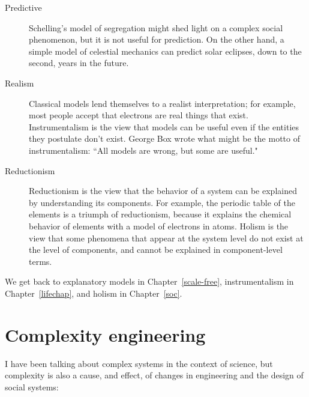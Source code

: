 \documentclass[12pt]{book}
\theoremstyle{exercise}
\newcommand{\myrightarrow}{\ensuremath \rightarrow}
\begin{document}
\begin{description}

\item[Predictive \myrightarrow~explanatory] Schelling's model
of segregation might shed light on a complex social phenomenon, but
it is not useful for prediction.  On the other hand, a simple model
of celestial mechanics can predict solar eclipses, down to the second,
years in the future.


\item[Realism \myrightarrow~instrumentalism] Classical models lend
  themselves to a realist interpretation; for example, most people
  accept that electrons are real things that exist.  Instrumentalism
  is the view that models can be useful even if the entities they
  postulate don't exist.  George Box wrote what might be the motto of
  instrumentalism: ``All models are wrong, but some are useful."


\item[Reductionism \myrightarrow~holism] Reductionism is the view that
  the behavior of a system can be explained by understanding its
  components.  For example, the periodic table of the elements is a
  triumph of reductionism, because it explains the chemical behavior
  of elements with a model of electrons in atoms.  Holism
  is the view that some phenomena that appear at the system level do
  not exist at the level of components, and cannot be explained in
  component-level terms.


\end{description}

We get back to explanatory models in Chapter~\ref{scale-free},
instrumentalism in Chapter~\ref{lifechap}, and holism in Chapter~\ref{soc}.


\section{Complexity engineering}

I have been talking about complex systems in the context of science,
but complexity is also a cause, and effect, of changes in engineering
and the design of social systems:

\end{document}
